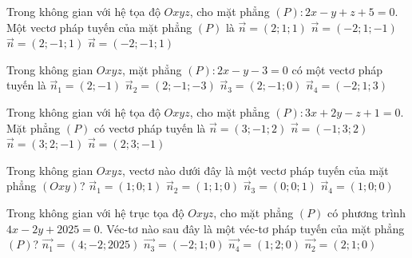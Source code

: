 \begin{ex}%
	Trong  không gian với hệ tọa độ $Oxyz$, cho mặt phẳng $(P)\colon 2x - y + z + 5 = 0$.
	Một vectơ  pháp tuyến của mặt phẳng $(P)$ là
	 \choice
		 {$\overrightarrow{n} = (2; 1; 1)$}
		{$\overrightarrow{n} = (-2; 1; -1)$} 
		{\True  $\overrightarrow{n} = (2; -1; 1)$}
		{$\overrightarrow{n} =  (-2; -1; 1)$}
\end{ex}

\begin{ex}%
	Trong không  gian $Oxyz$, mặt phẳng $(P)\colon2x-y-3=0$ có một vectơ pháp tuyến là
	 \choice
		 {$\overrightarrow{n}_1=\left(2;-1\right)$}
		 {$\overrightarrow{n}_2=\left(2;-1;-3\right)$}
		{$\overrightarrow{n}_3=\left(2;-1;0\right)$} 
		{\True  $\overrightarrow{n}_4=\left(-2;1;3\right)$}
\end{ex}

\begin{ex}%
	 Trong không gian với hệ tọa độ $Oxyz$, cho mặt phẳng $(P)\colon 3x+2y-z+1=0$. Mặt phẳng $(P)$ có vectơ pháp tuyến là
	 \choice
		{$\overrightarrow{n}=(3;-1;2)$} 
		{\True $\overrightarrow{n}=(-1;3;2)$} 
		{$\overrightarrow{n}=(3;2;-1)$} 
		{$\overrightarrow{n}=(2;3;-1)$} 
\end{ex}

\begin{ex}%
	 Trong không gian $Oxyz$, vectơ nào dưới đây là một vectơ pháp tuyến của mặt phẳng $(Oxy)$?
	\choice 
		{$\overrightarrow{n}_1 =  (1;0;1)$}
		{$\overrightarrow{n}_2 =  (1;1;0)$}
		{\True $\overrightarrow{n}_3 = (0;0;1)$} 
		{$\overrightarrow{n}_4 = (1;0;0)$} 
\end{ex}

\begin{ex}%
	Trong không gian với hệ trục tọa độ $Oxyz$, cho mặt phẳng $(P)$ có phương trình $4x-2y+2025=0$. Véc-tơ  nào sau đây là một véc-tơ pháp tuyến của mặt phẳng $(P)$?
	\choice 
		{$\overrightarrow{n_1}=(4;-2;2025)$} 
		{\True $\overrightarrow{n_3}=(-2;1;0)$} 
		 {$\overrightarrow{n_4}=(1;2;0)$}
		{$\overrightarrow{n_2}=(2;1;0)$} 
\end{ex}

